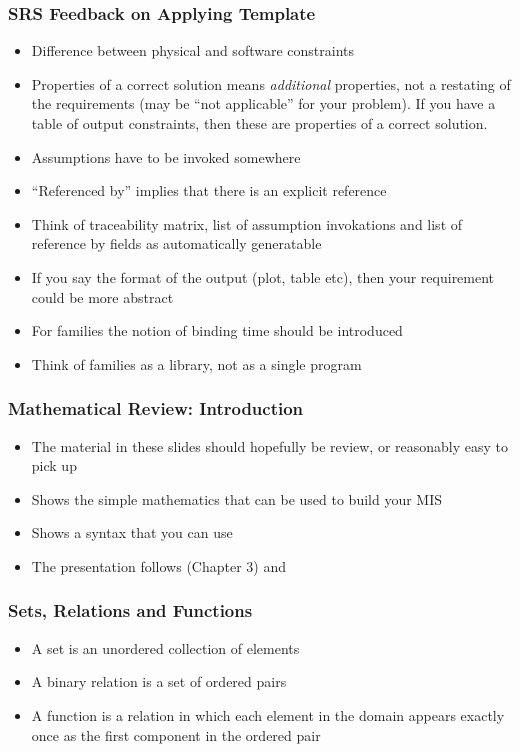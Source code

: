 \documentclass[t,12pt,numbers,fleqn]{beamer}
\begin{document}

\begin{frame}

\frametitle{SRS Feedback on Applying Template}

\begin{itemize}
\item Difference between physical and software constraints
\item Properties of a correct solution means \emph{additional} properties, not
  a restating of the requirements (may be ``not applicable'' for your problem).
  If you have a table of output constraints, then these are properties of a
  correct solution.
\item Assumptions have to be invoked somewhere
\item ``Referenced by'' implies that there is an explicit reference
\item Think of traceability matrix, list of assumption invokations and list of
  reference by fields as automatically generatable
\item If you say the format of the output (plot, table etc), then your
  requirement could be more abstract
\item For families the notion of binding time should be introduced
\item Think of families as a library, not as a single program
\end{itemize}
\end{frame}


\begin{frame}
\frametitle{Mathematical Review: Introduction}
\begin{itemize}
\item The material in these slides should hopefully be review, or
  reasonably easy to pick up
\item Shows the simple mathematics that can be used to build your MIS
\item Shows a syntax that you can use
\item The presentation follows \cite{HoffmanAndStrooper1995} (Chapter
  3) and \cite{GriesAndSchneider1993}
\end{itemize}
\end{frame}


\begin{frame}
\frametitle{Sets, Relations and Functions}
\begin{itemize}
\item A set is an unordered collection of elements
\item A binary relation is a set of ordered pairs
\item A function is a relation in which each element in the domain
  appears exactly once as the first component in the ordered pair
\end{itemize}
\end{frame}
\end{document}
